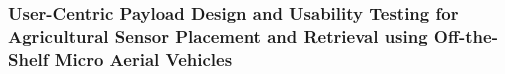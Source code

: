 \subsubsection{User-Centric Payload Design and Usability Testing for Agricultural Sensor Placement and Retrieval using Off-the-Shelf Micro Aerial Vehicles \cite{Geckeler2024a}}

